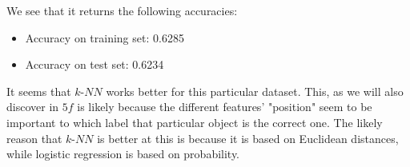 We see that it returns the following accuracies:
\begin{itemize}
\item Accuracy on training set: 0.6285
\item Accuracy on test set: 0.6234
\end{itemize}
It seems that $k$-$NN$ works better for this particular dataset. This, as we will also discover in $5f$ is likely because the different features' "position" seem to be important to which label that particular object is the correct one. The likely reason that $k$-$NN$ is better at this is because it is based on Euclidean distances, while logistic regression is based on probability.